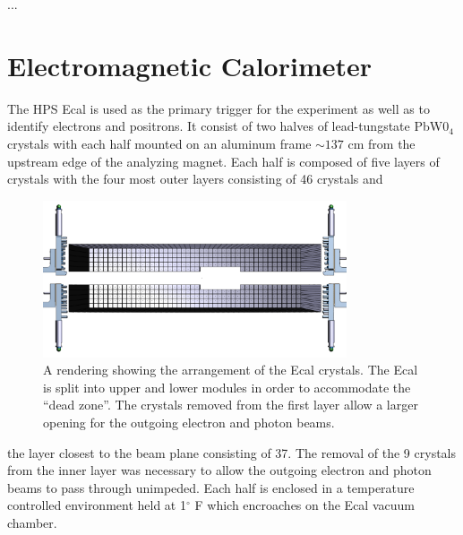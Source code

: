 ...


\section{Electromagnetic Calorimeter}

The HPS Ecal is used as the primary trigger for the experiment as well as to
identify electrons and positrons.  It consist of two halves of lead-tungstate 
PbW0$_4$ crystals with each half mounted on an aluminum frame $\sim 137$ cm 
from the upstream edge of the analyzing magnet.  Each half is composed of five
layers of crystals with the four most outer layers consisting of 46 crystals and 
\begin{figure}
    \centering
    \includegraphics[width=0.8\textwidth]{images/ecal_layout.png}
    \caption{A rendering showing the arrangement of the Ecal crystals.  The Ecal
             is split into upper and lower modules in order to accommodate the 
             ``dead zone''.  The crystals removed from the first layer allow
             a larger opening for the outgoing electron and photon beams.}
    \label{fig:ecal_layout}
\end{figure}
the layer closest to the beam plane consisting of 37. The removal of the 9 
crystals from the inner layer was necessary to allow the outgoing electron and
photon beams to pass through unimpeded.  Each half is enclosed in a temperature
controlled environment held at 1$^{\circ}$ F which encroaches on the Ecal 
vacuum chamber.


